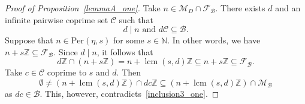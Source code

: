 \documentclass[leqno,a4paper,12pt]{article}
\DeclareMathOperator{\lcm}{lcm}
\theoremstyle{definition}
\newcommand{\divides}{\mid}
\newcommand{\Per}{\operatorname{Per}\nolimits}
\newcommand{\Z}{{\mathbb{Z}}}
\newcommand{\N}{{\mathbb{N}}}
\newcommand{\cC}{\mathcal{C}}
\newcommand{\sB}{\mathscr{B}}
\begin{document}
\begin{proof}[Proof of Proposition~\ref{lemmaA_one}]
Take $n\in\mathcal{M}_D\cap\mathcal{F}_\mathscr{B}$. There exists $d$ and an infinite pairwise coprime set $\mathcal{C}$ such that
\[
d\divides n \text{ and }d\mathcal{C}\subseteq\mathscr{B}.
\]
Suppose that $n\in\text{Per}(\eta,s)$ for some $s\in\N$. In other words, we have $n+s\Z\subseteq \mathcal{F}_\mathscr{B}$. Since $d\divides n$, it follows that
\begin{equation}\label{inclusion3_one}
d\Z\cap (n+s\Z)=n+\lcm(s,d)\Z\subseteq n+s\Z\subseteq\mathcal{F}_\sB.
\end{equation}
Take $c\in\mathcal{C}$ coprime to $s$ and $d$. Then
\[
\emptyset\neq (n+\lcm(s,d)\Z)\cap dc\Z \subseteq (n+\lcm(s,d)\Z)\cap\mathcal{M}_\sB
\]
as $dc\in\sB$. This, however, contradicts~\eqref{inclusion3_one}.
%
%

\end{proof}
\end{document}
